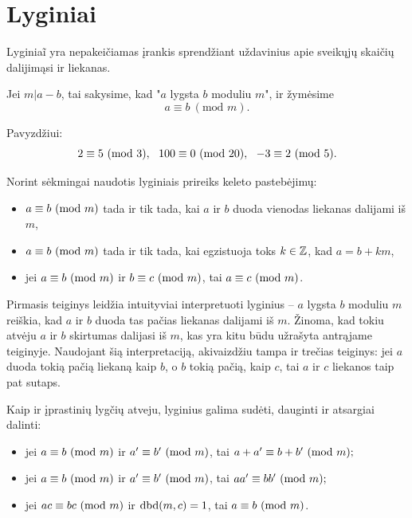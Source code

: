 \newpage
\section{Lyginiai}

Lyginia\~{i} yra nepakeičiamas įrankis sprendžiant uždavinius apie sveikųjų
skaičių dalijimąsi ir liekanas. 

\begin{api} 
  Jei $m|a-b$, tai sakysime, kad "$a$ lygsta $b$ moduliu $m$", ir žymėsime
  $$a\equiv b \ (\text{mod } m).$$
\end{api}

\noindent Pavyzdžiui: $$2\equiv 5 \m{3},\ \ 100\equiv 0 \m{20},\ \ -3\equiv 2
\m{5}.$$ 

Norint sėkmingai naudotis lyginiais prireiks keleto pastebėjimų: 

\begin{itemize} 
  \item $a\equiv b \ (\text{mod } m)$ tada ir tik tada, kai $a$ ir $b$ duoda vienodas
    liekanas dalijami iš $m$, 
  \item $a\equiv b \ (\text{mod } m)$ tada ir tik tada, kai egzistuoja toks $k\in \mathbb Z$,
    kad $a = b +km$, 
  \item jei $a\equiv b \ (\text{mod } m)$ ir $b\equiv c \ (\text{mod } m)$, tai $a\equiv c \ (\text{mod } m)$.
\end{itemize} 

Pirmasis teiginys leidžia intuityviai interpretuoti lyginius -- $a$ lygsta
$b$ moduliu $m$ reiškia, kad $a$ ir $b$ duoda tas pačias liekanas dalijami
iš $m$. Žinoma, kad tokiu atvėju $a$ ir $b$ skirtumas dalijasi iš $m$, kas
yra kitu būdu užrašyta antrąjame teiginyje. Naudojant šią interpretaciją,
akivaizdžiu tampa ir trečias teiginys: jei $a$ duoda tokią pačią liekaną
kaip $b$, o $b$ tokią pačią, kaip $c$, tai $a$ ir $c$ liekanos taip pat
sutaps.

Kaip ir įprastinių lygčių atveju, lyginius galima sudėti, dauginti ir
atsargiai dalinti:
\begin{teig}\mbox{}
\begin{itemize} 
  \item jei $a\equiv b \ (\text{mod } m)$ ir $a'\equiv b' \ (\text{mod } m)$, tai $a + a' \equiv b
    + b' \ (\text{mod } m);$ 
  \item jei $a\equiv b \ (\text{mod } m)$ ir $a'\equiv b' \ (\text{mod } m)$, tai $aa' \equiv bb'
    \ (\text{mod } m);$
  \item jei $ac\equiv bc \ (\text{mod } m)$ ir $\operatorname{dbd}(m,c)=1$, tai $a\equiv b \ (\text{mod } m)$.  
\end{itemize} 
\end{teig}

